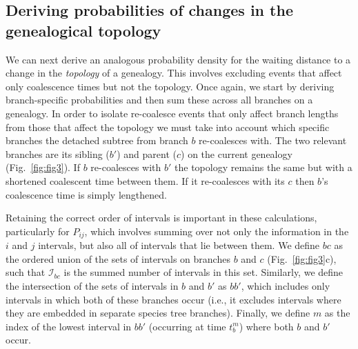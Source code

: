\documentclass[11pt]{article}
\begin{document}
\subsection{Deriving probabilities of changes in the genealogical topology}

We can next derive an analogous probability density for the waiting distance 
to a change in the \emph{topology} of a genealogy. This involves excluding 
events that affect only coalescence times but not the topology.
Once again, we start by deriving branch-specific probabilities and then sum 
these across all branches on a genealogy. 
In order to isolate re-coalesce events that only affect branch
lengths from those that affect the topology we must take into account which 
specific branches the detached subtree from branch $b$ re-coalesces with. 
The two relevant branches are its sibling ($b'$) and parent ($c$)
on the current genealogy (Fig.~\ref{fig:fig3}). 
If $b$ re-coalesces with $b'$ the topology remains the same but with a 
shortened coalescent time between them. If it re-coalesces with its $c$
then $b$'s coalescence time is simply lengthened. 



Retaining the correct order of intervals is important in these calculations, 
particularly for $P_{ij}$, which involves summing over not only the information
in the $i$ and $j$ intervals, but also all of intervals that lie between 
them. We define $bc$ as the ordered union of the sets of intervals on 
branches $b$ and $c$ (Fig.~\ref{fig:fig3}c), such that $\mathcal{I}_{bc}$ is 
the summed number of intervals in this set.
Similarly, we define the intersection of the sets of intervals in $b$
and $b'$ as $bb'$, which includes only intervals in which both of 
these branches occur (i.e., it excludes intervals where they
are embedded in separate species tree branches). Finally, we 
define $m$ as the index of the lowest interval in $bb'$ 
(occurring at time $t_b^m$) where both $b$ and $b'$ occur. 
\end{document}
